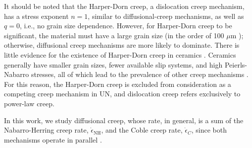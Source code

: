 \documentclass[preprint,12pt,sort&compress]{elsarticle} %
\newcommand{\?}{\stackrel{?}{=}}
\begin{document}
It should be noted that the Harper-Dorn creep, a dislocation creep mechanism, has a stress exponent $n=1$, similar to diffusional-creep mechanisms, as well as $q=0$, i.e., no grain size dependence. However, for Harper-Dorn creep to be significant, the material must have a large grain size (in the order of 100 $\mu$m \cite{Meyers2009}); otherwise, diffusional creep mechanisms are more likely to dominate. There is little evidence for the existence of Harper-Dorn creep in ceramics \cite{Meyers2009}. Ceramics generally have smaller grain sizes, fewer available slip systems, and high Peierls-Nabarro stresses, all of which lead to the prevalence of other creep mechanisms \cite{Meyers2009}. For this reason, the Harper-Dorn creep is excluded from consideration as a competing creep mechanism in UN, and dislocation creep refers exclusively to power-law creep.

In this work, we study diffusional creep, whose rate, in general, is a sum of the Nabarro-Herring creep rate, $\Dot{\epsilon}_{\mathrm{NH}}$, and the Coble creep rate, $\Dot{\epsilon}_C$, since both mechanisms operate in parallel \cite{Courtney2005}.

\end{document}
